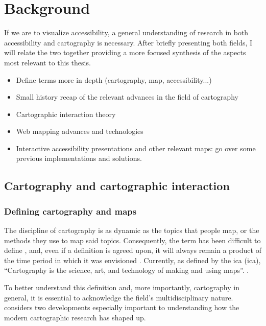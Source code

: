\section{Background}

If we are to visualize accessibility,
a general understanding of research in both accessibility and cartography is necessary.
After briefly presenting both fields,
I will relate the two together
providing a more focused synthesis of the aspects most relevant to this thesis.

\begin{itemize}
	\item Define terms more in depth (cartography, map, accessibility...)
	\item Small history recap of the relevant advances in the field of cartography
	\item Cartographic interaction theory
	\item Web mapping advances and technologies
	\item Interactive accessibility presentations and other relevant maps: go over some previous implementations and solutions.
\end{itemize}

\subsection{Cartography and cartographic interaction}

\subsubsection{Defining cartography and maps}
The discipline of cartography is as dynamic as the topics that people map,
or the methods they use to map said topics.
Consequently, the term has been difficult to define \parencite{kry1995},
and, even if a definition is agreed upon,
it will always remain a product of the time period
in which it was envisioned \parencite{tyn1992, and1996}.
Currently, as defined by the \acrlong{ica} (\acrshort{ica}),
\enquote{Cartography is the science, art, and technology of making and using maps}.
\parencite{ica2019}.


To better understand this definition and,
more importantly, cartography in general,
it is essential to acknowledge the field's multidisciplinary nature.
\parencite{kai2020}
\textcite{mac2004} considers two developments especially important
to understanding how the modern cartographic research has shaped up.

